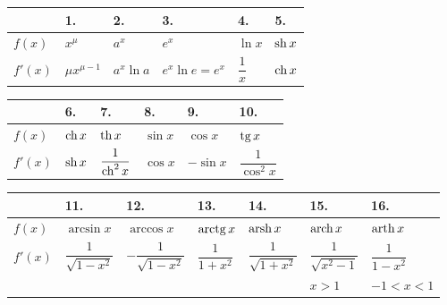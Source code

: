 \documentclass[11pt]{article}
\begin{document}
\begin{thmbox}
\begin{theorem}\leavevmode
\begin{center}
\renewcommand{\arraystretch}{2.1}
\begin{tabular}{C{1.1cm}|C{2.0cm}C{2.0cm}C{2.0cm}C{2.0cm}C{2.0cm}}
\hline
 & 1. & 2. & 3. & 4. & 5.\\
\hline
$f(x)$ & $x^{\mu}$ & $a^{x}$ & $e^{x}$ & $\ln x$ & $\operatorname{sh} x$\\
$f'(x)$ & $\mu x^{\mu-1}$ & $a^{x}\ln a$ & $e^{x}\ln e=e^{x}$ & $\dfrac{1}{x}$ & $\operatorname{ch} x$\\
\hline
\end{tabular}

\vspace{0.8em}
\begin{tabular}{C{1.1cm}|C{2.0cm}C{2.0cm}C{2.0cm}C{2.0cm}C{2.0cm}}
\hline
 & 6. & 7. & 8. & 9. & 10.\\
\hline
$f(x)$ & $\operatorname{ch} x$ & $\operatorname{th} x$ & $\sin x$ & $\cos x$ & $\operatorname{tg} x$\\
$f'(x)$ & $\operatorname{sh} x$ & $\dfrac{1}{\operatorname{ch}^{2}x}$ & $\cos x$ & $-\sin x$ & $\dfrac{1}{\cos^{2}x}$\\
\hline
\end{tabular}

\vspace{0.8em}
\begin{tabular}{C{1.1cm}|C{1.82cm}C{1.82cm}C{1.82cm}C{1.82cm}C{1.82cm}C{1.82cm}}
\hline
 & 11. & 12. & 13. & 14. & 15. & 16.\\
\hline
$f(x)$ & $\arcsin x$ & $\arccos x$ & $\operatorname{arctg} x$ & $\operatorname{arsh} x$ & $\operatorname{arch} x$ & $\operatorname{arth} x$\\
$f'(x)$ & $\dfrac{1}{\sqrt{1-x^{2}}}$ & $-\dfrac{1}{\sqrt{1-x^{2}}}$ & $\dfrac{1}{1+x^{2}}$
  & $\dfrac{1}{\sqrt{1+x^{2}}}$ & $\dfrac{1}{\sqrt{x^{2}-1}}$ & $\dfrac{1}{1-x^{2}}$\\[-0.6em]
 & & & & & {\footnotesize $x>1$} & {\footnotesize $-1<x<1$}\\
\hline
\end{tabular}
\end{center}
\end{theorem}
\end{thmbox}
\end{document}
